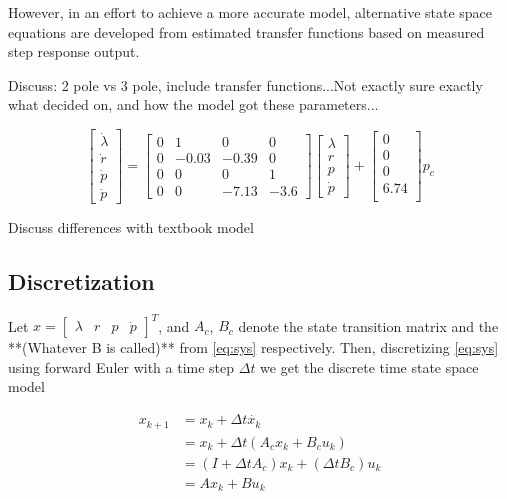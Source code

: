 However, in an effort to achieve a more accurate model, alternative state space equations are developed from estimated transfer functions based on measured step response output.

Discuss: 2 pole vs 3 pole, include transfer functions...Not exactly sure exactly what decided on, and how the model got these parameters...

\begin{equation}
	\begin{bmatrix}
		\dot{\lambda}\\
		\dot{r}\\
		\dot{p}\\
		\ddot{p}
	\end{bmatrix} = 
	\begin{bmatrix}
		0 & 1 & 0 & 0 \\
		0 & -0.03 & -0.39 & 0 \\
		0 & 0 & 0 & 1 \\
		0 & 0 & -7.13 & -3.6
	\end{bmatrix}
	\begin{bmatrix}
		\lambda	\\
		r		\\
		p		\\
		\dot{p}
	\end{bmatrix} +
	\begin{bmatrix}
		0 \\
		0 \\
		0 \\
		6.74 \\
	\end{bmatrix}
	p_c
	\label{eq:sys}
\end{equation}

Discuss differences with textbook model

\subsection{Discretization}
Let $x = \begin{bmatrix}\lambda&r&p&\dot{p}\end{bmatrix}^T$, and $A_c$, $B_c$ denote the state transition matrix and the **(Whatever B is called)** from \eqref{eq:sys} respectively. Then, discretizing \eqref{eq:sys} using forward Euler with a time step $\Delta t$ we get the discrete time state space model

\begin{subequations}
\label{eq:dmodel}
\begin{align}
	x_{k+1} &= x_k + \Delta t \dot{x_k} \\
			&= x_k + \Delta t (A_c x_k + B_c u_k)\\
			&= (I + \Delta t A_c) x_k + (\Delta t B_c) u_k \\
			&= A x_k + B u_k
\end{align}
\end{subequations}

